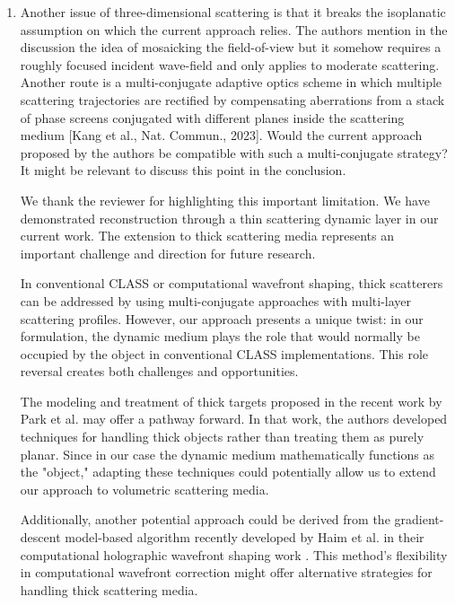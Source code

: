 \documentclass[12pt]{article}
\newenvironment{solved_reviewercomment}
    {\begin{tcolorbox}[width=\linewidth,colback=gray!5,colframe=solved_commentcolor!50,title=Reviewer Comment,left=5pt,right=5pt]}
    {\end{tcolorbox}}
\newenvironment{ourresponse}
    {\begin{tcolorbox}[width=\linewidth,breakable,enhanced,colback=gray!5,colframe=responsecolor!50,title=Response,left=5pt,right=5pt]}
    {\end{tcolorbox}}
\begin{document}
\begin{enumerate}[label=\arabic*.]
       
    \item \leavevmode\vspace{-\baselineskip}
    \begin{solved_reviewercomment}
        Another issue of three-dimensional scattering is that it breaks the isoplanatic assumption on which the current approach relies. The authors mention in the discussion the idea of mosaicking the field-of-view but it somehow requires a roughly focused incident wave-field and only applies to moderate scattering. Another route is a multi-conjugate adaptive optics scheme in which multiple scattering trajectories are rectified by compensating aberrations from a stack of phase screens conjugated with different planes inside the scattering medium [Kang et al., Nat. Commun., 2023]. Would the current approach proposed by the authors be compatible with such a multi-conjugate strategy? It might be relevant to discuss this point in the conclusion.
    \end{solved_reviewercomment}
    \begin{ourresponse}
        We thank the reviewer for highlighting this important limitation. We have demonstrated reconstruction through a thin scattering dynamic layer in our current work. The extension to thick scattering media represents an important challenge and direction for future research.
    
        In conventional CLASS or computational wavefront shaping, thick scatterers can be addressed by using multi-conjugate approaches with multi-layer scattering profiles. However, our approach presents a unique twist: in our formulation, the dynamic medium plays the role that would normally be occupied by the object in conventional CLASS implementations. This role reversal creates both challenges and opportunities.
        
        The modeling and treatment of thick targets proposed in the recent work by Park et al. \cite{oh2025digital} may offer a pathway forward. In that work, the authors developed techniques for handling thick objects rather than treating them as purely planar. Since in our case the dynamic medium mathematically functions as the "object," adapting these techniques could potentially allow us to extend our approach to volumetric scattering media.
    
        Additionally, another potential approach could be derived from the gradient-descent model-based algorithm recently developed by Haim et al. in their computational holographic wavefront shaping work \cite{haim2025image}. This method's flexibility in computational wavefront correction might offer alternative strategies for handling thick scattering media.
        

\end{ourresponse}
\end{enumerate}
\end{document}
